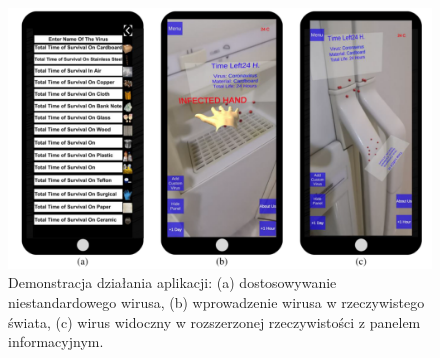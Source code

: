\begin{figure}[h!]
	\includegraphics[width=\linewidth]{VirusIn3DSpaces.png}
	\caption{Demonstracja działania aplikacji: (a) dostosowywanie niestandardowego wirusa, (b) wprowadzenie wirusa w rzeczywistego świata, (c) wirus widoczny w rozszerzonej rzeczywistości z panelem informacyjnym.}
\end{figure}



